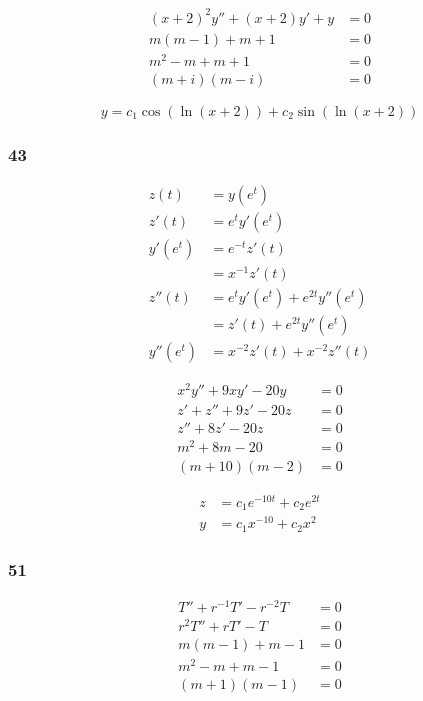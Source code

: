 \documentclass{article}
\begin{document}
\begin{align*}
  (x + 2)^2 y'' + (x + 2) y' + y & = 0 \\
  m (m - 1) + m + 1              & = 0 \\
  m^2 - m + m + 1                & = 0 \\
  (m + i) (m - i)                & = 0
\end{align*}

\[y = c_1 \cos (\ln (x + 2)) + c_2 \sin (\ln (x + 2))\]

\subsubsection{43}

\begin{align*}
  z(t)     & = y(e^t)                        \\
  z'(t)    & = e^t y'(e^t)                   \\
  y'(e^t)  & = e^{-t} z'(t)                  \\
           & = x^{-1} z'(t)                  \\
  z''(t)   & = e^t y'(e^t) + e^{2t} y''(e^t) \\
           & = z'(t) + e^{2t} y''(e^t)       \\
  y''(e^t) & = x^{-2} z'(t) + x^{-2} z''(t)
\end{align*}

\begin{align*}
  x^2 y'' + 9 x y' - 20 y & = 0 \\
  z' + z'' + 9 z' - 20 z  & = 0 \\
  z'' + 8 z' - 20 z       & = 0 \\
  m^2 + 8 m - 20          & = 0 \\
  (m + 10) (m - 2)        & = 0
\end{align*}

\begin{align*}
  z & = c_1 e^{-10t} + c_2 e^{2t} \\
  y & = c_1 x^{-10} + c_2 x^2
\end{align*}

\subsubsection{51}

\begin{align*}
  T'' + r^{-1} T' - r^{-2} T & = 0 \\
  r^2 T'' + r T' - T         & = 0 \\
  m (m - 1) + m - 1          & = 0 \\
  m^2 - m + m - 1            & = 0 \\
  (m + 1) (m - 1)            & = 0
\end{align*}
\end{document}
